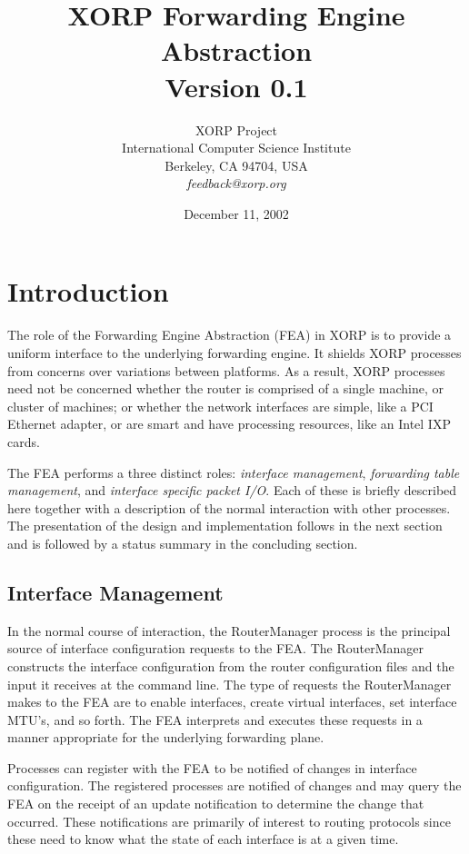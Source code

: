 \documentclass[11pt]{article}
\title{XORP Forwarding Engine Abstraction \\
\vspace{1ex}
Version 0.1}
\author{ XORP Project					\\
	 International Computer Science Institute	\\
	 Berkeley, CA 94704, USA			\\
	 {\it feedback@xorp.org}
}
\date{December 11, 2002}
\begin{document}
\maketitle

\section{Introduction}

The role of the Forwarding Engine Abstraction (FEA) in XORP is to
provide a uniform interface to the underlying forwarding engine.  It
shields XORP processes from concerns over variations between
platforms.  As a result, XORP processes need not be concerned whether
the router is comprised of a single machine, or cluster of machines;
or whether the network interfaces are simple, like a PCI Ethernet
adapter, or are smart and have processing resources, like an Intel IXP
cards.

The FEA performs a three distinct roles: \emph{interface management},
\emph{forwarding table management}, and \emph{interface specific
packet I/O}.  Each of these is briefly described here together with a
description of the normal interaction with other processes.  The
presentation of the design and implementation follows in the next
section and is followed by a status summary in the concluding section.

\subsection{Interface Management}

In the normal course of interaction, the RouterManager process is the
principal source of interface configuration requests to the FEA.  The
RouterManager constructs the interface configuration from the router
configuration files and the input it receives at the command line.
The type of requests the RouterManager makes to the FEA are to enable
interfaces, create virtual interfaces, set interface MTU's, and so
forth.  The FEA interprets and executes these requests in a manner
appropriate for the underlying forwarding plane.

Processes can register with the FEA to be notified of changes in
interface configuration.  The registered processes are notified of
changes and may query the FEA on the receipt of an update notification
to determine the change that occurred.  These notifications are
primarily of interest to routing protocols since these need to know
what the state of each interface is at a given time.
\end{document}
